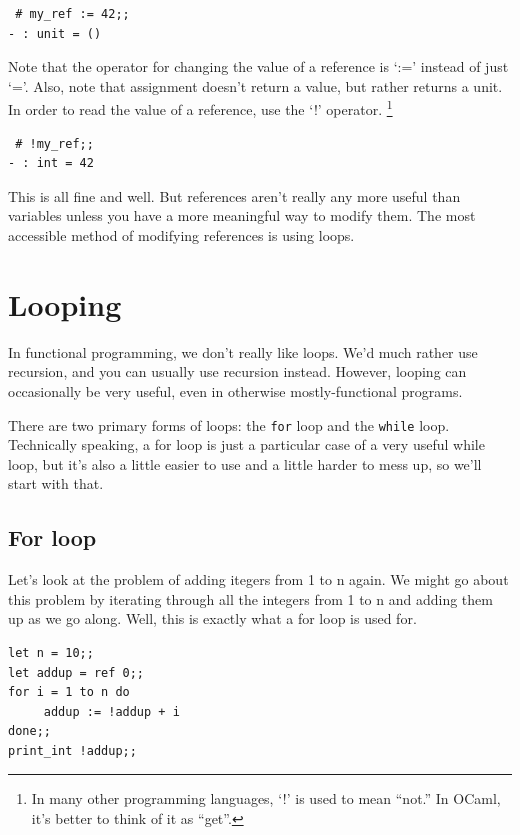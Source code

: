 \documentclass[10pt]{book}
\begin{document}
{\beforeverb
\begin{verbatim}
 # my_ref := 42;;
- : unit = ()
\end{verbatim}
\afterverb

Note that the operator for changing the value of a reference is `:=' instead of just `='. Also, note that
assignment doesn't return a value, but rather returns a unit. In order to read the value of a reference, use
the `!' operator. \footnote{In many other programming languages, `!' is used to mean ``not.'' In OCaml, it's 
better to think of it as ``get''.}

\beforeverb
\begin{verbatim}
 # !my_ref;;
- : int = 42
\end{verbatim}
\afterverb

This is all fine and well. But references aren't really any more useful than variables
unless you have a more meaningful way to modify them. The most accessible
method of modifying references is using loops.

\section{Looping}

In functional programming, we don't really like loops. We'd much rather
use recursion, and you can usually use recursion instead. However, looping
can occasionally be very useful, even in otherwise mostly-functional programs.


There are two primary forms of loops: the {\tt for} loop and the {\tt while}
loop. Technically speaking, a for loop is just a particular case of a very useful
while loop, but it's also a little easier to use and a little harder to mess up, so
we'll start with that.

\subsection{For loop}

Let's look at the problem of adding itegers from 1 to n again. 
We might go about this problem by iterating through all the integers from 1 to n and 
adding them up as we go along. Well, this is exactly what a for loop is used for.

\beforeverb
\begin{verbatim}
let n = 10;;
let addup = ref 0;;
for i = 1 to n do
     addup := !addup + i
done;;
print_int !addup;;
\end{verbatim}
\afterverb

}
\end{document}
